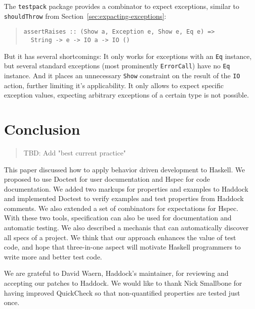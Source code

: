 \documentclass[preprint]{sigplanconf}
\begin{document}
The {\tt testpack} package provides a combinator to expect exceptions,
similar to {\tt shouldThrow} from
Section~\ref{sec:expacting-exceptions}:

\begin{quote}
\small
\begin{verbatim}
assertRaises :: (Show a, Exception e, Show e, Eq e) =>
  String -> e -> IO a -> IO ()
\end{verbatim}
\end{quote}

\noindent But it has several shortcomings:
It only works for exceptions with an {\tt Eq} instance,
but several standard exceptions (most
prominently {\tt ErrorCall}) have no {\tt Eq} instance.
And it places an unnecessary {\tt Show} constraint on the
result of the {\tt IO} action, further limiting it's applicability.
It only allows to expect specific exception values, expecting
arbitrary exceptions of a certain type is not possible.

\section{Conclusion}

\begin{quote}
    TBD: Add "best current practice"
\end{quote}

This paper discussed how to apply behavior driven development to
Haskell.  We proposed to use Doctest for user documentation and Hspec
for code documentation. We added two markups for
properties and examples to Haddock and implemented
Doctest to verify examples and test properties from Haddock comments.
We also extended a set of combinators for expectations for Hspec.
With these two tools, specification can also be
used for documentation and automatic testing.  We also described a
mechanis that can automatically discover all specs of a project.  We
think that our approach enhances the value of test code, and hope
that three-in-one aspect will motivate Haskell programmers to write
more and better test code.

\acks

We are grateful to David Waern, Haddock's maintainer, for reviewing and
accepting our patches to Haddock.
We would like to thank
Nick Smallbone for having improved QuickCheck so that
non-quantified properties are tested just once.




\end{document}
